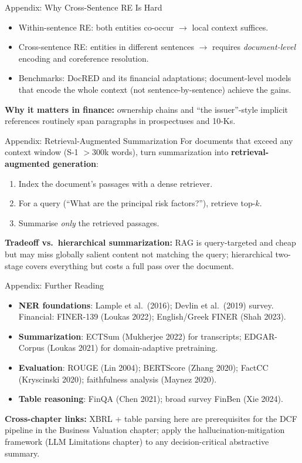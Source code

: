 \documentclass[9pt,t]{beamer}
\begin{document}
\begin{frame}[noframenumbering]{Appendix: Why Cross-Sentence RE Is Hard}
\begin{itemize}
  \item Within-sentence RE: both entities co-occur $\to$ local context suffices.
  \item Cross-sentence RE: entities in different sentences $\to$ requires
        \emph{document-level} encoding and coreference resolution.
  \item Benchmarks: DocRED and its financial adaptations; document-level models
        that encode the whole context (not sentence-by-sentence) achieve the gains.
\end{itemize}
\medskip
\textbf{Why it matters in finance:} ownership chains and ``the issuer''-style
implicit references routinely span paragraphs in prospectuses and 10-Ks.
\end{frame}

\begin{frame}[noframenumbering]{Appendix: Retrieval-Augmented Summarization}
For documents that exceed any context window (S-1 $>$300k words), turn
summarization into \textbf{retrieval-augmented generation}:
\begin{enumerate}
  \item Index the document's passages with a dense retriever.
  \item For a query (``What are the principal risk factors?''), retrieve top-$k$.
  \item Summarise \emph{only} the retrieved passages.
\end{enumerate}
\medskip
\textbf{Tradeoff vs.\ hierarchical summarization:} RAG is query-targeted and cheap
but may miss globally salient content not matching the query; hierarchical
two-stage covers everything but costs a full pass over the document.
\end{frame}

\begin{frame}[noframenumbering]{Appendix: Further Reading}
\begin{itemize}
  \item \textbf{NER foundations}: Lample et al.\ (2016); Devlin et al.\ (2019) survey.
        Financial: FINER-139 (Loukas 2022); English/Greek FINER (Shah 2023).
  \item \textbf{Summarization}: ECTSum (Mukherjee 2022) for transcripts;
        EDGAR-Corpus (Loukas 2021) for domain-adaptive pretraining.
  \item \textbf{Evaluation}: ROUGE (Lin 2004); BERTScore (Zhang 2020); FactCC
        (Kryscinski 2020); faithfulness analysis (Maynez 2020).
  \item \textbf{Table reasoning}: FinQA (Chen 2021); broad survey FinBen (Xie 2024).
\end{itemize}
\medskip
\textbf{Cross-chapter links:} XBRL + table parsing here are prerequisites for the
DCF pipeline in the Business Valuation chapter; apply the hallucination-mitigation
framework (LLM Limitations chapter) to any decision-critical abstractive summary.
\end{frame}
\end{document}
